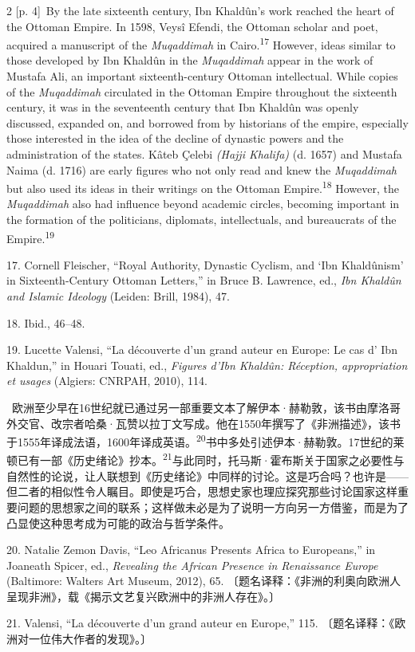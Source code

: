 \documentclass[10pt,a4paper]{article}
\begin{document}
\begin{paracol}{2}
{\scriptsize\color{gray} [p. 4]}\ By the late sixteenth century, Ibn Khaldûn’s work reached the heart of the Ottoman Empire. In 1598, Veysî Efendi, the Ottoman scholar and poet, acquired a manuscript of the \textit{Muqaddimah} in Cairo.\nobreak\textsuperscript{17} However, ideas similar to those developed by Ibn Khaldûn in the \textit{Muqaddimah} appear in the work of Mustafa Ali, an important sixteenth-century Ottoman intellectual. While copies of the \textit{Muqaddimah} circulated in the Ottoman Empire throughout the sixteenth century, it was in the seventeenth century that Ibn Khaldûn was openly discussed, expanded on, and borrowed from by historians of the empire, especially those interested in the idea of the decline of dynastic powers and the administration of the states. Kâteb Çelebi \textit{(Hajji Khalifa)} (d. 1657) and Mustafa Naima (d. 1716) are early figures who not only read and knew the \textit{Muqaddimah} but also used its ideas in their writings on the Ottoman Empire.\nobreak\textsuperscript{18} However, the \textit{Muqaddimah} also had influence beyond academic circles, becoming important in the formation of the politicians, diplomats, intellectuals, and bureaucrats of the Empire.\nobreak\textsuperscript{19}\par{\small 17. Cornell Fleischer, “Royal Authority, Dynastic Cyclism, and ‘Ibn Khaldûnism’ in Sixteenth-Century Ottoman Letters,” in Bruce B. Lawrence, ed., \textit{Ibn Khaldûn and Islamic Ideology} (Leiden: Brill, 1984), 47.\par}{\small 18. Ibid., 46–48.\par}{\small 19. Lucette Valensi, “La découverte d’un grand auteur en Europe: Le cas d’ Ibn Khaldun,” in Houari Touati, ed., \textit{Figures d’Ibn Khaldûn: Réception, appropriation et usages} (Algiers: CNRPAH, 2010), 114.\par}
\switchcolumn*
{\scriptsize\color{gray} [p. 5]}\ 欧洲至少早在16世纪就已通过另一部重要文本了解伊本·赫勒敦，该书由摩洛哥外交官、改宗者哈桑·瓦赞以拉丁文写成。他在1550年撰写了《非洲描述》，该书于1555年译成法语，1600年译成英\mbox{语。\textsuperscript{20}}书中多处引述伊本·赫勒敦。17世纪的莱顿已有一部《历史绪论》抄\mbox{本。\textsuperscript{21}}与此同时，托马斯·霍布斯关于国家之必要性与自然性的论说，让人联想到《历史绪论》中同样的讨论。这是巧合吗？也许是——但二者的相似性令人瞩目。即使是巧合，思想史家也理应探究那些讨论国家这样重要问题的思想家之间的联系；这样做未必是为了说明一方向另一方借鉴，而是为了凸显使这种思考成为可能的政治与哲学条件。\par{\small 20. Natalie Zemon Davis, “Leo Africanus Presents Africa to Europeans,” in Joaneath Spicer, ed., \textit{Revealing the African Presence in Renaissance Europe} (Baltimore: Walters Art Museum, 2012), 65. 〔题名译释：《非洲的利奥向欧洲人呈现非洲》，载《揭示文艺复兴欧洲中的非洲人存在》。〕\par}{\small 21. Valensi, “La découverte d’un grand auteur en Europe,” 115. 〔题名译释：《欧洲对一位伟大作者的发现》。〕\par}

\end{paracol}
\end{document}
